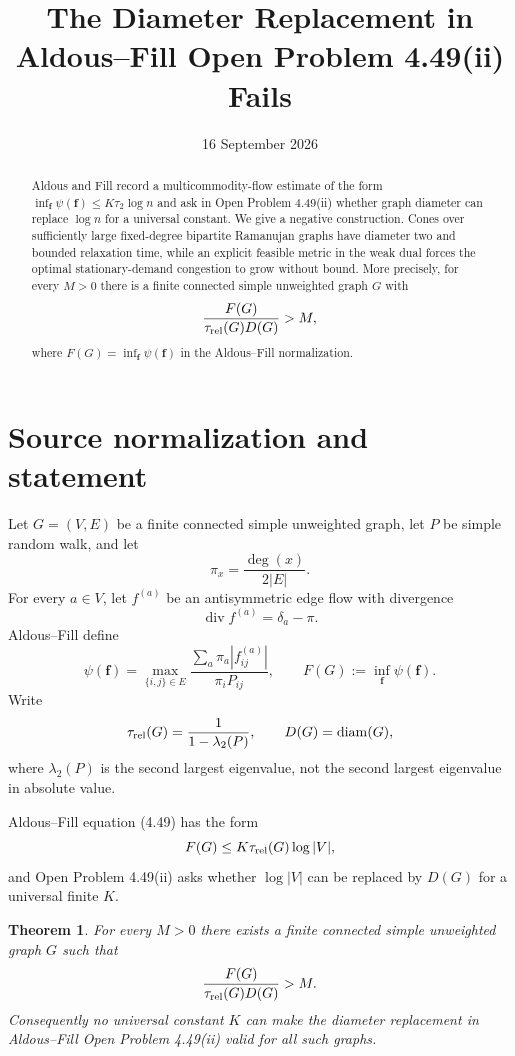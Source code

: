 \documentclass[11pt]{article}
\title{The Diameter Replacement in Aldous--Fill Open Problem 4.49(ii) Fails}
\author{}
\date{16 September 2026}
\newtheorem{theorem}{Theorem}
\begin{document}
\maketitle

\begin{abstract}
Aldous and Fill record a multicommodity-flow estimate of the form
$\inf_{\mathbf f}\psi(\mathbf f)\le K\tau_2\log n$ and ask in Open Problem 4.49(ii) whether graph diameter can replace $\log n$ for a universal constant.  We give a negative construction.  Cones over sufficiently large fixed-degree bipartite Ramanujan graphs have diameter two and bounded relaxation time, while an explicit feasible metric in the weak dual forces the optimal stationary-demand congestion to grow without bound.  More precisely, for every $M>0$ there is a finite connected simple unweighted graph $G$ with
\[
 \frac{F(G)}{\tau_{\rm rel}(G)D(G)}>M,
\]
where $F(G)=\inf_{\mathbf f}\psi(\mathbf f)$ in the Aldous--Fill normalization.
\end{abstract}

\section{Source normalization and statement}
Let $G=(V,E)$ be a finite connected simple unweighted graph, let $P$ be simple random walk, and let
\[
 \pi_x=\frac{\deg(x)}{2|E|}.
\]
For every $a\in V$, let $f^{(a)}$ be an antisymmetric edge flow with divergence
\[
 \operatorname{div}f^{(a)}=\delta_a-\pi.
\]
Aldous--Fill define
\[
 \psi(\mathbf f)=
 \max_{\{i,j\}\in E}
 \frac{\sum_a\pi_a|f_{ij}^{(a)}|}{\pi_iP_{ij}},
 \qquad
 F(G):=\inf_{\mathbf f}\psi(\mathbf f).
\]
Write
\[
 \tau_{\rm rel}(G)=\frac1{1-\lambda_2(P)},
 \qquad
 D(G)=\operatorname{diam}(G),
\]
where $\lambda_2(P)$ is the second largest eigenvalue, not the second largest eigenvalue in absolute value.

Aldous--Fill equation (4.49) has the form
\[
 F(G)\le K\tau_{\rm rel}(G)\log |V|,
\]
and Open Problem 4.49(ii) asks whether $\log |V|$ can be replaced by $D(G)$ for a universal finite $K$.

\begin{theorem}\label{thm:main}
For every $M>0$ there exists a finite connected simple unweighted graph $G$ such that
\[
 \frac{F(G)}{\tau_{\rm rel}(G)D(G)}>M.
\]
Consequently no universal constant $K$ can make the diameter replacement in Aldous--Fill Open Problem 4.49(ii) valid for all such graphs.
\end{theorem}
\end{document}
